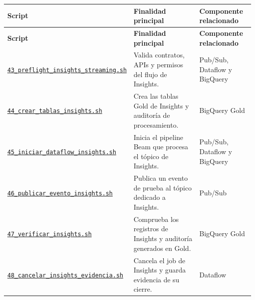 \documentclass[11pt]{article}
\begin{document}
\begin{longtable}{@{}>{\raggedright\arraybackslash}p{}>{\raggedright\arraybackslash}p{}>{\raggedright\arraybackslash}p{}@{}}
\toprule
\textbf{Script} & \textbf{Finalidad principal} & \textbf{Componente relacionado} \\
\midrule
\endfirsthead
\toprule
\textbf{Script} & \textbf{Finalidad principal} & \textbf{Componente relacionado} \\
\midrule
\endhead
\href{https://github.com/Codenid/lumina-retail-data-platform/blob/main/implementation/automatizacion/scripts43_preflight_insights_streaming.sh}{\texttt{43\_\allowbreak{}preflight\_\allowbreak{}insights\_\allowbreak{}streaming.sh}} & Valida contratos, APIs y permisos del flujo de Insights. & Pub/Sub, Dataflow y BigQuery \\
\href{https://github.com/Codenid/lumina-retail-data-platform/blob/main/implementation/automatizacion/scripts44_crear_tablas_insights.sh}{\texttt{44\_\allowbreak{}crear\_\allowbreak{}tablas\_\allowbreak{}insights.sh}} & Crea las tablas Gold de Insights y auditoría de procesamiento. & BigQuery Gold \\
\href{https://github.com/Codenid/lumina-retail-data-platform/blob/main/implementation/automatizacion/scripts45_iniciar_dataflow_insights.sh}{\texttt{45\_\allowbreak{}iniciar\_\allowbreak{}dataflow\_\allowbreak{}insights.sh}} & Inicia el pipeline Beam que procesa el tópico de Insights. & Pub/Sub, Dataflow y BigQuery \\
\href{https://github.com/Codenid/lumina-retail-data-platform/blob/main/implementation/automatizacion/scripts46_publicar_evento_insights.sh}{\texttt{46\_\allowbreak{}publicar\_\allowbreak{}evento\_\allowbreak{}insights.sh}} & Publica un evento de prueba al tópico dedicado a Insights. & Pub/Sub \\
\href{https://github.com/Codenid/lumina-retail-data-platform/blob/main/implementation/automatizacion/scripts47_verificar_insights.sh}{\texttt{47\_\allowbreak{}verificar\_\allowbreak{}insights.sh}} & Comprueba los registros de Insights y auditoría generados en Gold. & BigQuery Gold \\
\href{https://github.com/Codenid/lumina-retail-data-platform/blob/main/implementation/automatizacion/scripts48_cancelar_insights_evidencia.sh}{\texttt{48\_\allowbreak{}cancelar\_\allowbreak{}insights\_\allowbreak{}evidencia.sh}} & Cancela el job de Insights y guarda evidencia de su cierre. & Dataflow \\
\bottomrule
\end{longtable}
\endgroup
\end{document}
